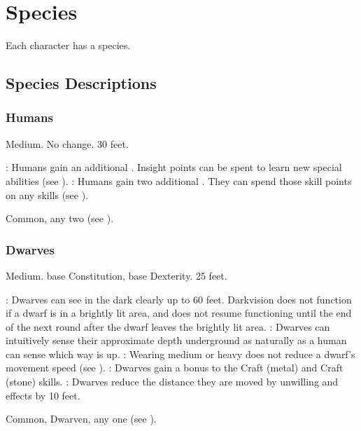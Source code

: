 \chapter{Species}\label{Species}

Each character has a species.

\section{Species Descriptions}

\subsection{Humans}
 Medium.
 No change.
 30 feet.
\begin{itemize}
    : Humans gain an additional .
        Insight points can be spent to learn new special abilities (see ).
    : Humans gain two additional . They can spend those skill points on any skills (see ).
\end{itemize}
 Common, any two  (see ).

\subsection{Dwarves}
 Medium.
  base Constitution,  base Dexterity.
 25 feet.
\begin{itemize}
    : Dwarves can see in the dark clearly up to 60 feet. Darkvision does not function if a dwarf is in a brightly lit area, and does not resume functioning until the end of the next round after the dwarf leaves the brightly lit area.
    : Dwarves can intuitively sense their approximate depth underground as naturally as a human can sense which way is up.
    : Wearing medium or heavy  does not reduce a dwarf's movement speed (see ).
    : Dwarves gain a  bonus to the Craft (metal) and Craft (stone) skills.
    : Dwarves reduce the distance they are moved by unwilling  and  effects by 10 feet.
\end{itemize}
 Common, Dwarven, any one  (see ).

